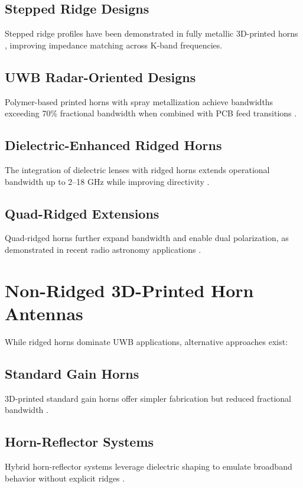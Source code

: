 \documentclass[conference]{IEEEtran}
\begin{document}
\subsection{Stepped Ridge Designs}
Stepped ridge profiles have been demonstrated in fully metallic 3D-printed horns \cite{stepped_ridge_2018}, improving impedance matching across K-band frequencies.

\subsection{UWB Radar-Oriented Designs}
Polymer-based printed horns with spray metallization achieve bandwidths exceeding 70\% fractional bandwidth when combined with PCB feed transitions \cite{pcb_feed_uwb}.

\subsection{Dielectric-Enhanced Ridged Horns}
The integration of dielectric lenses with ridged horns extends operational bandwidth up to 2–18 GHz while improving directivity \cite{dielectric_lens_2022}.

\subsection{Quad-Ridged Extensions}
Quad-ridged horns further expand bandwidth and enable dual polarization, as demonstrated in recent radio astronomy applications \cite{quad_ridge_2025}.

\section{Non-Ridged 3D-Printed Horn Antennas}
While ridged horns dominate UWB applications, alternative approaches exist:

\subsection{Standard Gain Horns}
3D-printed standard gain horns offer simpler fabrication but reduced fractional bandwidth \cite{standard_gain_2023}.

\subsection{Horn-Reflector Systems}
Hybrid horn-reflector systems leverage dielectric shaping to emulate broadband behavior without explicit ridges \cite{horn_reflector_2018}.
\end{document}
